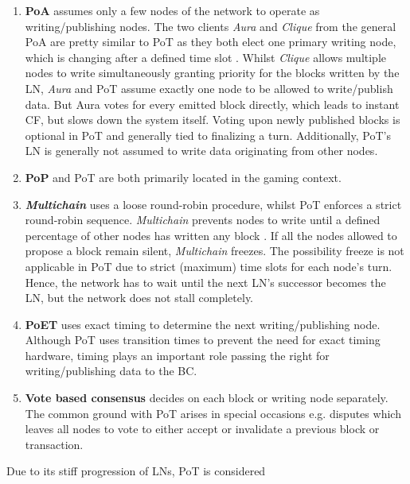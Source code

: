 \begin{enumerate}
	\item \textbf{\gls{PoA}} assumes only a few nodes of the network to operate as writing/publishing nodes.
	The two clients \textit{Aura} and \textit{Clique} from the general \gls{PoA} are pretty similar to \gls{PoT}
	as they both elect one primary writing node, which is changing after a defined time slot \cite[2]{Angelis.2018}.
	Whilst \textit{Clique} allows multiple nodes to write simultaneously granting priority for the blocks written by the \gls{LN},
	\textit{Aura} and \gls{PoT} assume exactly one node to be allowed to write/publish data.
	But Aura votes for every emitted block directly,
	which leads to instant \gls{CF}, but slows down the system itself.
	Voting upon newly published blocks is optional in \gls{PoT} and generally tied to finalizing a turn.
	Additionally, \gls{PoT}'s \gls{LN} is generally not assumed to write data originating from other nodes.
	
	\item \textbf{\gls{PoP}} and \gls{PoT} are both primarily located in the gaming context.
	
	\item \textbf{\textit{Multichain}} uses a loose round-robin procedure, whilst \gls{PoT} enforces a strict round-robin sequence.
	\textit{Multichain} prevents nodes to write until a defined percentage of other nodes has written any block \cite[7-8]{Greenspan.2015}.
	If all the nodes allowed to propose a block remain silent, \textit{Multichain} freezes.
	The possibility freeze is not applicable in \gls{PoT} due to strict (maximum) time slots for each node's turn.
	Hence, the network has to wait until the next \gls{LN}'s successor becomes the \gls{LN}, but the network does not stall completely.
	
	\item \textbf{\gls{PoET}} uses exact timing to determine the next writing/publishing node.
	Although \gls{PoT} uses transition times to prevent the need for exact timing hardware,
	timing plays an important role passing the right for writing/publishing data to the \gls{BC}.

	\item \textbf{Vote based consensus} decides on each block or writing node separately.
	The common ground with \gls{PoT} arises in special occasions e.g. disputes
	which leaves all nodes to vote to either accept or invalidate a previous block or transaction.
\end{enumerate}
\noindent Due to its stiff progression of \gls{LN}s, \gls{PoT} is considered
